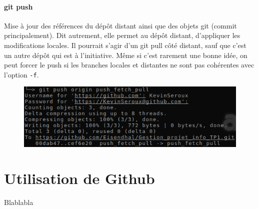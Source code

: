 \documentclass[11pt,canadien]{article}
\begin{document}
\paragraph{git push}Mise à jour des références du dépôt distant ainsi que des objets git (commit principalement). Dit autrement, elle permet au dépôt distant, d'appliquer les modifications locales. Il pourrait s'agir d'un git pull côté distant, sauf que c'est un autre dépôt qui est à l'initiative. Même si c'est rarement une bonne idée, on peut forcer le push si les branches locales et distantes ne sont pas cohérentes avec l'option \texttt{-f}.
\begin{figure}[H]
	\centering
	\includegraphics{images/git_push.png}
\end{figure}

\newpage
\section{Utilisation de Github}
Blablabla
\end{document}
